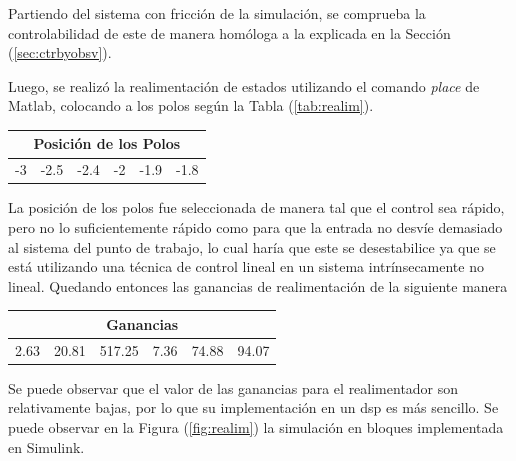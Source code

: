 %
%



Partiendo del sistema con fricción de la simulación, se comprueba la controlabilidad de este de manera homóloga a la explicada en la Sección (\ref{sec:ctrbyobsv}). 




Luego, se realizó la realimentación de estados utilizando el comando \textit{place} de Matlab, colocando a los polos según la Tabla (\ref{tab:realim}).

\begin{table}[H]
\centering
\begin{tabular}{@{}cccccc@{}}
\toprule
\multicolumn{6}{c}{Posición de los Polos} \\ \midrule
-3   & -2.5   & -2.4  & -2  & -1.9  & -1.8  \\ \bottomrule
\end{tabular}
\end{table}
\label{tab:realim}

La posición de los polos fue seleccionada de manera tal que el control sea rápido, pero no lo suficientemente rápido como para que la entrada no desvíe demasiado al sistema del punto de trabajo, lo cual haría que este se desestabilice ya que se está utilizando una técnica de control lineal en un sistema intrínsecamente no lineal.
Quedando entonces las ganancias de realimentación de la siguiente manera

\begin{table}[H]
\centering
\begin{tabular}{@{}cccccc@{}}
\toprule
\multicolumn{6}{c}{Ganancias}                    \\ \midrule
2.63 & 20.81 & 517.25 & 7.36 & 74.88 & 94.07 \\ \bottomrule
\end{tabular}
\end{table}
Se puede observar que el valor de las ganancias para el realimentador son relativamente bajas, por lo que su implementación en un dsp es más sencillo.
Se puede observar en la Figura (\ref{fig:realim}) la simulación en bloques implementada en Simulink.

